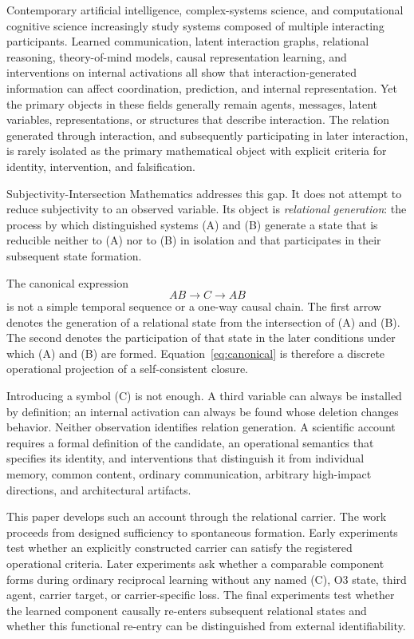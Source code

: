 \documentclass[11pt,a4paper]{article}
\begin{document}
Contemporary artificial intelligence, complex-systems science, and computational cognitive science increasingly study systems composed of multiple interacting participants. Learned communication, latent interaction graphs, relational reasoning, theory-of-mind models, causal representation learning, and interventions on internal activations all show that interaction-generated information can affect coordination, prediction, and internal representation. Yet the primary objects in these fields generally remain agents, messages, latent variables, representations, or structures that describe interaction. The relation generated through interaction, and subsequently participating in later interaction, is rarely isolated as the primary mathematical object with explicit criteria for identity, intervention, and falsification.

Subjectivity-Intersection Mathematics addresses this gap. It does not attempt to reduce subjectivity to an observed variable. Its object is \emph{relational generation}: the process by which distinguished systems (A) and (B) generate a state that is reducible neither to (A) nor to (B) in isolation and that participates in their subsequent state formation.

The canonical expression
\begin{equation}
  AB \rightarrow C \rightarrow AB
  \label{eq:canonical}
\end{equation}
is not a simple temporal sequence or a one-way causal chain. The first arrow denotes the generation of a relational state from the intersection of (A) and (B). The second denotes the participation of that state in the later conditions under which (A) and (B) are formed. Equation~\eqref{eq:canonical} is therefore a discrete operational projection of a self-consistent closure.

Introducing a symbol (C) is not enough. A third variable can always be installed by definition; an internal activation can always be found whose deletion changes behavior. Neither observation identifies relation generation. A scientific account requires a formal definition of the candidate, an operational semantics that specifies its identity, and interventions that distinguish it from individual memory, common content, ordinary communication, arbitrary high-impact directions, and architectural artifacts.

This paper develops such an account through the relational carrier. The work proceeds from designed sufficiency to spontaneous formation. Early experiments test whether an explicitly constructed carrier can satisfy the registered operational criteria. Later experiments ask whether a comparable component forms during ordinary reciprocal learning without any named (C), O3 state, third agent, carrier target, or carrier-specific loss. The final experiments test whether the learned component causally re-enters subsequent relational states and whether this functional re-entry can be distinguished from external identifiability.
\end{document}
